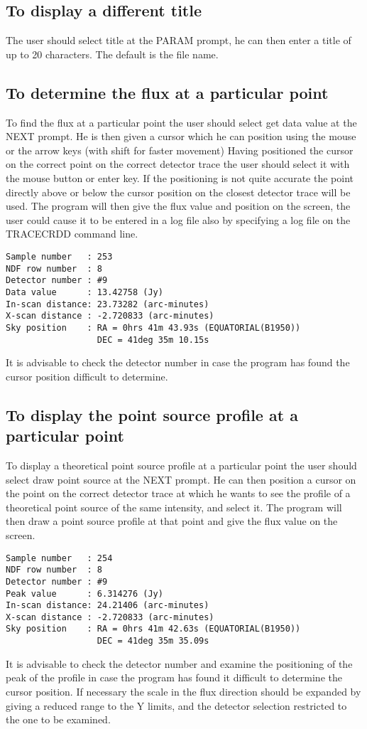 \subsection{To display a different title}
The user should select title at the PARAM prompt, he can then enter a title of
up to 20 characters. The default is the file name.
\subsection{To determine the flux at a particular point}
To find the flux at a particular point the user should select get data value at
the NEXT prompt. He is then given a cursor which he can position using the mouse
or the arrow keys (with shift for faster movement) Having positioned the cursor
on the correct point on the correct detector trace the user should select it
with the mouse button or enter key. If the positioning is not quite accurate
the point directly above or below the cursor position on the closest detector
trace will be used. The program will then give the flux value and position on
the screen, the user could cause it to be entered in a log file also by
specifying a log file on the TRACECRDD command line.
\begin{small}
\begin{verbatim}
Sample number   : 253  
NDF row number  : 8    
Detector number : #9  
Data value      : 13.42758 (Jy)
In-scan distance: 23.73282 (arc-minutes)
X-scan distance : -2.720833 (arc-minutes)
Sky position    : RA = 0hrs 41m 43.93s (EQUATORIAL(B1950))
                  DEC = 41deg 35m 10.15s
\end{verbatim}
\end{small}
It is advisable to check the detector number in case the program has found the
cursor position difficult to determine.
\subsection{To display the point source profile at a particular point}
To display a theoretical point source profile at a particular point the user
should select draw point source at the NEXT prompt. He can then position a
cursor on the point on the correct detector trace at which he wants to see the
profile of a theoretical point source of the same intensity, and select it. The
program will then draw a point source profile at that point and give the flux
value on the screen.
\begin{small}
\begin{verbatim}
Sample number   : 254  
NDF row number  : 8    
Detector number : #9  
Peak value      : 6.314276 (Jy)
In-scan distance: 24.21406 (arc-minutes)
X-scan distance : -2.720833 (arc-minutes)
Sky position    : RA = 0hrs 41m 42.63s (EQUATORIAL(B1950))
                  DEC = 41deg 35m 35.09s
\end{verbatim}
\end{small}
It is advisable to check the detector number and examine the positioning of the 
peak of the profile in case the program has found it difficult to determine 
the cursor position. If necessary the scale in the flux direction should be 
expanded by giving a reduced range to the Y limits, and the detector selection 
restricted to the one to be examined.

